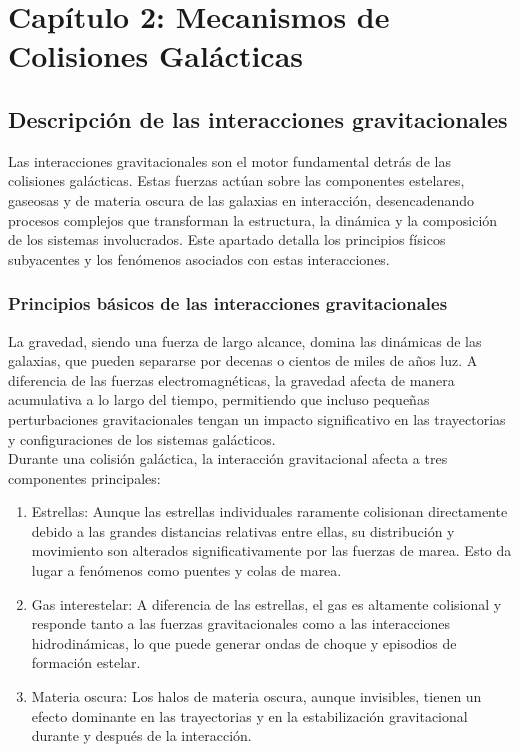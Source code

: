 \documentclass{article}
\begin{document}
\section{Capítulo 2: Mecanismos de Colisiones Galácticas}
\subsection{Descripción de las interacciones gravitacionales}
Las interacciones gravitacionales son el motor fundamental detrás de las colisiones galácticas. Estas fuerzas actúan sobre las componentes estelares, gaseosas y de materia oscura de las galaxias en interacción, desencadenando procesos complejos que transforman la estructura, la dinámica y la composición de los sistemas involucrados. Este apartado detalla los principios físicos subyacentes y los fenómenos asociados con estas interacciones.

\subsubsection{Principios básicos de las interacciones gravitacionales}
La gravedad, siendo una fuerza de largo alcance, domina las dinámicas de las galaxias, que pueden separarse por decenas o cientos de miles de años luz. A diferencia de las fuerzas electromagnéticas, la gravedad afecta de manera acumulativa a lo largo del tiempo, permitiendo que incluso pequeñas perturbaciones gravitacionales tengan un impacto significativo en las trayectorias y configuraciones de los sistemas galácticos. \\

Durante una colisión galáctica, la interacción gravitacional afecta a tres componentes principales:

\begin{enumerate}
    \item Estrellas: Aunque las estrellas individuales raramente colisionan directamente debido a las grandes distancias relativas entre ellas, su distribución y movimiento son alterados significativamente por las fuerzas de marea. Esto da lugar a fenómenos como puentes y colas de marea.
    \item Gas interestelar: A diferencia de las estrellas, el gas es altamente colisional y responde tanto a las fuerzas gravitacionales como a las interacciones hidrodinámicas, lo que puede generar ondas de choque y episodios de formación estelar.
    \item Materia oscura: Los halos de materia oscura, aunque invisibles, tienen un efecto dominante en las trayectorias y en la estabilización gravitacional durante y después de la interacción.
\end{enumerate}
\end{document}
